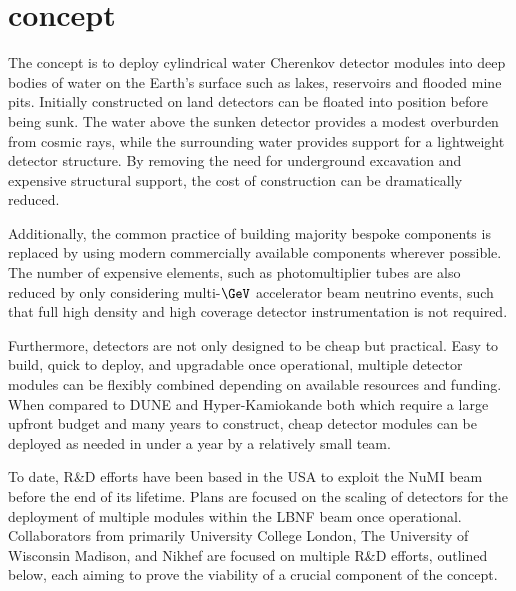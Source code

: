 \section{\chips concept} %
\label{sec:chips_concept} %

The \chips concept is to deploy cylindrical water Cherenkov detector modules into deep bodies of
water on the Earth's surface such as lakes, reservoirs and flooded mine pits. Initially
constructed on land \chips detectors can be floated into position before being sunk. The water
above the sunken detector provides a modest overburden from cosmic rays, while the surrounding
water provides support for a lightweight detector structure. By removing the need for underground
excavation and expensive structural support, the cost of construction can be dramatically reduced.

Additionally, the common practice of building majority bespoke components is replaced by using
modern commercially available components wherever possible. The number of expensive elements, such
as photomultiplier tubes are also reduced by only considering multi-$\GeV$ accelerator beam
neutrino events, such that full high density and high coverage detector instrumentation is not
required.

Furthermore, \chips detectors are not only designed to be cheap but practical. Easy to build,
quick to deploy, and upgradable once operational, multiple detector modules can be flexibly
combined depending on available resources and funding. When compared to DUNE and Hyper-Kamiokande
both which require a large upfront budget and many years to construct, cheap \chips detector
modules can be deployed as needed in under a year by a relatively small team.

To date, \chips R\&D efforts have been based in the USA to exploit the NuMI beam before the end of
its lifetime. Plans are focused on the scaling of \chips detectors for the deployment of multiple
modules within the LBNF beam once operational. Collaborators from primarily University College
London, The University of Wisconsin Madison, and Nikhef are focused on multiple R\&D efforts,
outlined below, each aiming to prove the viability of a crucial component of the \chips concept.


